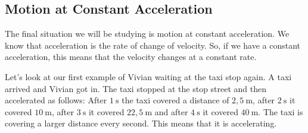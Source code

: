             \subsection*{Motion at Constant Acceleration}
            \nopagebreak
        \label{m38795*id71822}The final situation we will be studying is motion at constant acceleration. We know that acceleration is the rate of change of velocity. So, if we have a constant acceleration, this means that the velocity changes at a constant rate.\par 
        \label{m38795*id71827}Let's look at our first example of Vivian waiting at the taxi stop again. A taxi arrived and Vivian got in. The taxi stopped at the stop street and then accelerated as follows: After $1~\text{s}$ the taxi covered a distance of $2,5~\text{m}$, after $2~\text{s}$ it covered $10~\text{m}$, after $3~\text{s}$ it covered $22,5~\text{m}$ and after $4~\text{s}$ it covered $40~\text{m}$. The taxi is covering a larger distance every second. This means that it is accelerating.\par 
    \setcounter{subfigure}{0}
